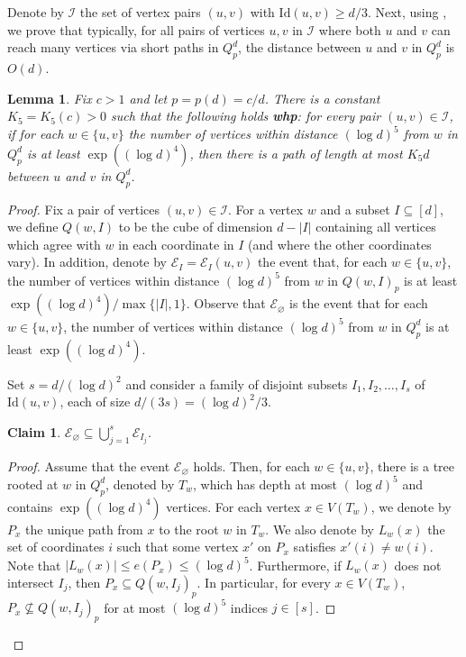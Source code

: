 \documentclass[reqno,final,a4paper]{amsart}
\newtheorem{lemma}[thm]{Lemma}
\newtheorem{claim}[thm]{Claim}
\theoremstyle{definition}
\newcommand{\cE}{\mathcal{E}}
\newcommand{\cI}{\mathcal{I}}
\def\Id{\mathrm{Id}}
\newcommand{\1}{\mathbbm{1}}
\begin{document}
Denote by $\cI$ the set of vertex pairs $(u,v)$ with $\Id(u,v)\ge d/3$.
Next, using , we prove that typically, for all pairs of vertices $u,v$ in $\cI$ where both $u$ and $v$ can reach many vertices via short paths in $Q^d_p$, 
the distance between $u$ and $v$ in $Q^d_p$ is $O(d)$.

\begin{lemma}\label{lem:diameter_for a pair}
Fix $c>1$ and let $p=p(d)=c/d$. There is a constant $K_5=K_5(c)>0$ such that the following holds \textbf{whp}: for every pair $(u,v)\in \cI$, if for each $w\in \{u,v\}$ the number of vertices within distance $(\log d)^5$ from $w$ in $Q_p^d$ is at least $\exp((\log d)^4)$, then there is a path of length at most $K_5d$ between $u$ and $v$ in $Q^d_p$.
\end{lemma}
\begin{proof}
Fix a pair of vertices $(u,v)\in \cI$. For a vertex $w$ and a subset $I\subseteq [d]$, we define $Q(w,I)$ to be the cube of dimension $d-|I|$ containing all vertices which agree with $w$ in each coordinate in $I$ (and where the other coordinates vary). 
In addition, denote by $\mathcal{E}_I=\mathcal{E}_I(u,v)$ the event that, for each $w\in \{u,v\}$, the number of vertices within distance $(\log d)^5$ from $w$ in $Q(w,I)_p$ is at least $\exp((\log d)^4)/\max\{|I|,1\}$. Observe that $\cE_{\varnothing}$ is the event that for each $w\in \{u,v\}$, the number of vertices within distance $(\log d)^5$ from $w$ in $Q^d_p$ is at least $\exp((\log d)^4)$.

Set $s=d/(\log d)^2$ and consider a family of disjoint subsets $I_1,I_2,\ldots,I_s$ of $\Id(u,v)$, each of size $d/(3s)=(\log d)^2/3$.
 
\begin{claim}\label{claim:smallerevents}
$\cE_\varnothing\subseteq \bigcup_{j=1}^s \cE_{I_j}$.
\end{claim}
\begin{proof}
Assume that the event $\mathcal{E}_\varnothing$ holds. 
Then, for each $w\in \{u,v\}$, there is a tree rooted at $w$ in $Q^d_p$, denoted by $T_w$, which has depth at most $(\log d)^5$ and contains $\exp((\log d)^4)$ vertices.
For each vertex $x\in V(T_w)$, we denote by $P_x$ the unique path from $x$ to the root $w$ in $T_w$. 
We also denote by $L_w(x)$ the set of coordinates $i$ such that some vertex $x'$ on $P_x$ satisfies $x'(i)\neq w(i)$.
Note that $|L_w(x)|\le e(P_x)\le (\log d)^5$. Furthermore, if $L_w(x)$ does not intersect $I_j$, then $P_x\subseteq Q(w,I_j)_p$.
In particular, for every $x\in V(T_w)$, $P_x\not\subseteq Q(w,I_j)_p$ for at most $(\log d)^5$ indices $j\in [s]$.


\end{proof}
\end{proof}
\end{document}
